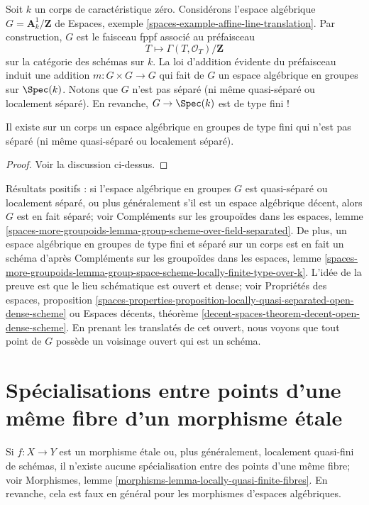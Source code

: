 \medskip\noindent
Soit $k$ un corps de caractéristique zéro.
Considérons l'espace algébrique $G = \mathbf{A}^1_k/\mathbf{Z}$ de
Espaces, exemple \ref{spaces-example-affine-line-translation}.
Par construction, $G$ est le faisceau fppf associé au préfaisceau
$$
T \longmapsto \Gamma(T, \mathcal{O}_T) / \mathbf{Z}
$$
sur la catégorie des schémas sur $k$. La loi d'addition évidente du préfaisceau
induit une addition $m : G \times G \to G$ qui fait de $G$ un espace
algébrique en groupes sur $\Spec(k)$. Notons que $G$ n'est pas séparé
(ni même quasi-séparé ou localement séparé). En revanche,
$G \to \Spec(k)$ est de type fini !

\begin{lemma}
\label{lemma-non-separated-group-space}
Il existe sur un corps un espace algébrique en groupes de type fini
qui n'est pas séparé (ni même quasi-séparé ou localement séparé).
\end{lemma}

\begin{proof}
Voir la discussion ci-dessus.
\end{proof}

\noindent
Résultats positifs : si l'espace algébrique en groupes $G$ est
quasi-séparé ou localement séparé, ou plus généralement s'il est
un espace algébrique décent, alors $G$ est en fait séparé; voir
Compléments sur les groupoïdes dans les espaces, lemme
\ref{spaces-more-groupoids-lemma-group-scheme-over-field-separated}.
De plus, un espace algébrique en groupes de type fini et séparé sur un
corps est en fait un schéma d'après Compléments sur les groupoïdes dans les espaces, lemme
\ref{spaces-more-groupoids-lemma-group-space-scheme-locally-finite-type-over-k}.
L'idée de la preuve est que le lieu schématique est ouvert et dense; voir
Propriétés des espaces, proposition
\ref{spaces-properties-proposition-locally-quasi-separated-open-dense-scheme}
ou
Espaces décents, théorème \ref{decent-spaces-theorem-decent-open-dense-scheme}.
En prenant les translatés de cet ouvert, nous voyons que
tout point de $G$ possède un voisinage ouvert qui est un schéma.




\section{Spécialisations entre points d'une même fibre d'un morphisme étale}
\label{section-specializations-fibre-etale}

\noindent
Si $f : X \to Y$ est un morphisme étale ou, plus généralement, localement
quasi-fini de schémas, il n'existe aucune spécialisation entre des points
d'une même fibre; voir
Morphismes, lemme \ref{morphisms-lemma-locally-quasi-finite-fibres}.
En revanche, cela est faux en général pour les morphismes d'espaces algébriques.

